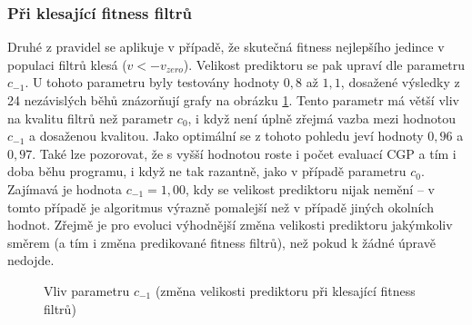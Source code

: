 \subsubsection*{Při klesající fitness filtrů}

Druhé z pravidel se aplikuje v případě, že skutečná fitness nejlepšího jedince v populaci filtrů klesá ($v < -v_\mathit{zero}$). Velikost prediktoru se pak upraví dle parametru $c_{-1}$. U tohoto parametru byly testovány hodnoty $0,8$ až $1,1$, dosažené výsledky z 24 nezávislých běhů znázorňují grafy na obrázku \ref{plotDecrcoef-30kg}. Tento parametr má větší vliv na kvalitu filtrů než parametr $c_0$, i když není úplně zřejmá vazba mezi hodnotou $c_{-1}$ a dosaženou kvalitou. Jako optimální se z tohoto pohledu jeví hodnoty $0,96$ a $0,97$. Také lze pozorovat, že s vyšší hodnotou roste i počet evaluací CGP a tím i doba běhu programu, i když ne tak razantně, jako v případě parametru $c_0$. Zajímavá je hodnota $c_{-1} = 1,00$, kdy se velikost prediktoru nijak nemění -- v tomto případě je algoritmus výrazně pomalejší než v případě jiných okolních hodnot. Zřejmě je pro evoluci výhodnější změna velikosti prediktoru jakýmkoliv směrem (a tím i změna predikované fitness filtrů), než pokud k žádné úpravě nedojde.

\begin{figure}[tbp]
    \centering
    \baselineskip
    \caption{Vliv parametru $c_{-1}$ (změna velikosti prediktoru při klesající fitness filtrů)}
    \label{plotDecrcoef-30kg}
\end{figure}

